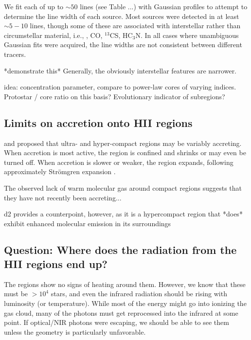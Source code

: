 \documentclass{aa}
\begin{document}
We fit each of up to $\sim50$ lines (see Table ...) with Gaussian profiles to
attempt to determine the line width of each source.  Most sources were detected
in at least $\sim5-10$ lines, though some of these are associated with
interstellar rather than circumstellar material, i.e., \formaldehyde, CO, $^{13}$CS,
HC$_3$N.  In all cases where unambiguous Gaussian fits were acquired, the line
widths are not consistent between different tracers.  

*demonstrate this* Generally, the obviously interstellar features are narrower.

idea: concentration parameter, compare to power-law cores of varying indices.
Protostar / core ratio on this basis?  Evolutionary indicator of subregions?


\subsection{Limits on accretion onto HII regions}
\citet{Peters2010a} and \citet{Klaassen2012a} proposed that ultra- and
hyper-compact \hii regions may be variably accreting.  When accretion is most
active, the \hii region is confined and shrinks or may even be turned off.
When accretion is slower or weaker, the \hii region expands, following
approximately Str{\"o}mgren expansion .  

The observed lack of warm molecular gas around compact \hii regions suggests
that they have not recently been accreting...

d2 provides a counterpoint, however, as it is a hypercompact \hii region that *does*
exhibit enhanced molecular emission in its surroundings


\subsection{Question: Where does the radiation from the HII regions end up?}
The \hii regions show no signs of heating around them.  However, we know that
these must be $>10^4$ \lsun stars, and even the infrared radiation should be
rising with luminosity (or temperature).  While most of the energy might go
into ionizing the gas cloud, many of the photons must get reprocessed into the
infrared at some point.  If optical/NIR photons were escaping, we should be
able to see them unless the geometry is particularly unfavorable.



\end{document}
